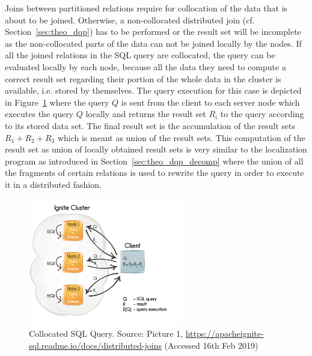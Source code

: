 Joins between partitioned relations require for collocation of the data that is about to be joined. Otherwise, a non-collocated distributed join 
(cf. Section~\ref{sec:theo_dqp}) has to be performed or the result set will be incomplete as the non-collocated parts of the data can not be joined locally 
by the nodes. If all the joined relations in the SQL query are collocated, the query can be evaluated locally by each node, because all the data they need to
compute a correct result set regarding  their portion of the whole data in the cluster is available, i.e. stored by themselves. The query execution for this 
case is depicted in Figure~\ref{fig:ign_collocated} where the query $Q$ is sent from the client to each server node which executes the query $Q$ locally 
and returns the result set $R_i$ to the query according to its stored data set. The final result set is the accumulation of the result sets $R_1+R_2+R_3$
which is meant as union of the result sets. This computation of the result set as union of locally obtained result sets is very similar to the localization
program \cite[p.~199]{Ozsu1991} as introduced in Section~\ref{sec:theo_dqp_decomp} where the union of all the fragments of certain relations is used to
rewrite the query in order to execute it in a distributed fashion.  
\begin{figure}[ht]
    \centering
    \includegraphics[width=0.6\textwidth,keepaspectratio=true]{img/2af89cf-Collocated_sql_queries.png}
    \caption{Collocated SQL Query. Source: Picture 1, \protect\url{https://apacheignite-sql.readme.io/docs/distributed-joins} (Accessed 16th Feb 2019)}
    \label{fig:ign_collocated}
\end{figure}

